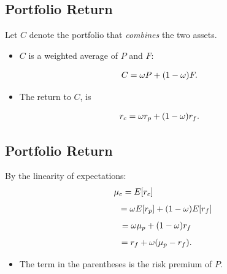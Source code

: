 \documentclass[letterpaper,10pt,english]{sphinxmanual}
\begin{document}
\subsection{Portfolio Return}
\label{allocation:portfolio-return}
Let $C$ denote the portfolio that \emph{combines} the two assets.
\begin{itemize}
\item {} 
$C$ is a weighted average of $P$ and $F$:

\end{itemize}
\begin{gather}
\begin{split}C = \omega P + (1-\omega) F.\end{split}\notag
\end{gather}\begin{itemize}
\item {} 
The return to $C$, is

\end{itemize}
\begin{gather}
\begin{split}r_c = \omega r_p + (1-\omega) r_f.\end{split}\notag
\end{gather}

\subsection{Portfolio Return}
\label{allocation:id4}
By the linearity of expectations:
\begin{gather}
\begin{split}\mu_c = E[r_c] \qquad \qquad \qquad\end{split}\notag
\end{gather}\begin{gather}
\begin{split}\quad \enspace \, = \omega E[r_p] + (1 - \omega)E[r_f]\end{split}\notag
\end{gather}\begin{gather}
\begin{split}= \omega \mu_p + (1-\omega) r_f \enspace \,\end{split}\notag
\end{gather}\begin{gather}
\begin{split}= r_f + \omega(\mu_p - r_f). \enspace \,\end{split}\notag
\end{gather}\begin{itemize}
\item {} 
The term in the parentheses is the risk premium of $P$.

\end{itemize}
\end{document}

